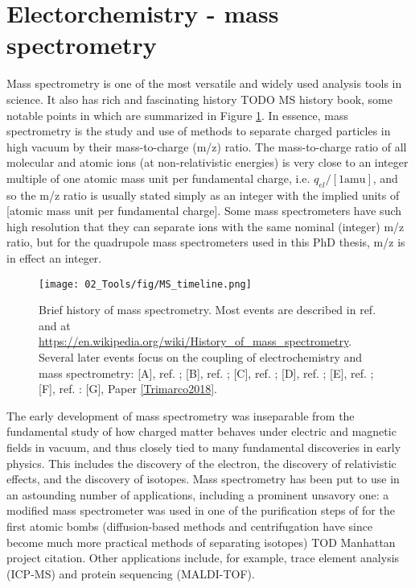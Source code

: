 \section{Electorchemistry - mass spectrometry}\label{sec:ECMS}

Mass spectrometry is one of the most versatile and widely used analysis tools in science\cite{Gross2007, Harris2010}. It also has rich and fascinating history{\color{red} TODO MS history book}, some notable points in which are summarized in Figure \ref{fig:MS_timeline}. In essence, mass spectrometry is the study and use of methods to separate charged particles in high vacuum by their mass-to-charge (m/z) ratio. The mass-to-charge ratio of  all molecular and atomic ions (at non-relativistic energies) is very close to an integer multiple of one atomic mass unit per fundamental charge, i.e. $q_{el}/[1 \text{amu}]$, and so the m/z ratio is usually stated simply as an integer with the implied units of [atomic mass unit per fundamental charge]. Some mass spectrometers have such high resolution that they can separate ions with the same nominal (integer) m/z ratio\cite{Gross2007}, but for the quadrupole mass spectrometers used in this PhD thesis, m/z is in effect an integer.

\begin{figure}[h!]
	\centering
	\texttt{[image: 02\_Tools/fig/MS\_timeline.png]}
	\caption{Brief history of mass spectrometry. Most events are described in ref.  and at \url{https://en.wikipedia.org/wiki/History_of_mass_spectrometry}. Several later events focus on the coupling of electrochemistry and mass spectrometry: [A], ref. ; [B], ref. ; [C], ref. ; [D], ref. ; [E], ref. ; [F], ref. : [G], Paper \ref{Trimarco2018}.}
	\label{fig:MS_timeline}
\end{figure}

The early development of mass spectrometry was inseparable from the fundamental study of how charged matter behaves under electric and magnetic fields in vacuum, and thus closely tied to many fundamental discoveries in early physics. This includes the discovery of the electron, the discovery of relativistic effects, and the discovery of isotopes. Mass spectrometry has been put to use in an astounding number of applications, including a prominent unsavory one: a modified mass spectrometer was used in one of the purification steps of  for the first atomic bombs (diffusion-based methods and centrifugation have since become much more practical methods of separating isotopes) {\color{red} TOD Manhattan project citation}. Other applications include, for example, trace element analysis (ICP-MS) and protein sequencing (MALDI-TOF).

